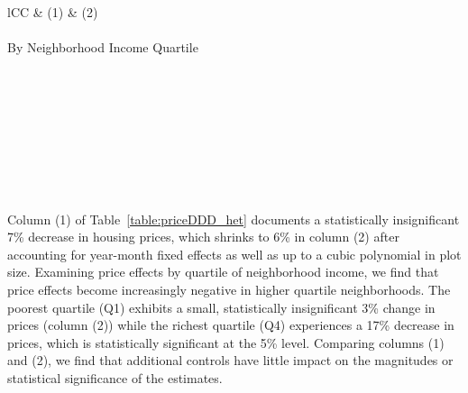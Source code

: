 \documentclass[12pt]{article}
\begin{document}
\begin{table}
\small
\centering
\caption{Triple-Difference Estimates of Log-Prices 0 to 500 Meters Outside of Housing Projects}\label{table:priceDDD_het}
\vspace{-2mm}
\begin{tabular}{lCC}
\toprule
 & \small (1) & \small (2)   \\ \midrule 
 \\
By Neighborhood Income Quartile \\[.3em]
 
\bottomrule
{} \\[-.3em]
 \\[-.3em]
 \\[-.3em]
 \\[-.3em]
 \\[-.3em]
 \\[-.3em]
 \\[-.3em]
 \\[-.3em]
\end{tabular}
\end{table}

Column (1) of Table~\ref{table:priceDDD_het} documents a statistically insignificant 7\% decrease in housing prices, which shrinks to 6\% in column (2) after accounting for year-month fixed effects as well as up to a cubic polynomial in plot size.  Examining price effects by quartile of neighborhood income, we find that price effects become increasingly negative in higher quartile neighborhoods.  The poorest quartile (Q1) exhibits a small, statistically insignificant 3\% change in prices (column (2)) while the richest quartile (Q4) experiences a 17\% decrease in prices, which is statistically significant at the 5\% level.  Comparing columns (1) and (2), we find that additional controls have little impact on the magnitudes or statistical significance of the estimates.
\end{document}
